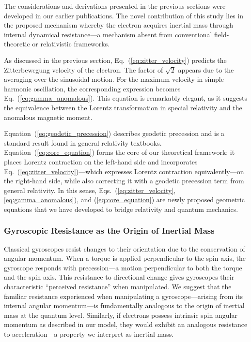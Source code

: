 \documentclass[%
 reprint,
 amsmath,amssymb,
 aps,
]{revtex4-1}
\numberwithin{equation}{section}%
\begin{document}
The considerations and derivations presented in the previous sections were developed in our earlier publications. The novel contribution of this study lies in the proposed mechanism whereby the electron acquires inertial mass through internal dynamical resistance—a mechanism absent from conventional field-theoretic or relativistic frameworks.

As discussed in the previous section, Eq.~(\ref{eq:zitter_velocity}) predicts the Zitterbewegung velocity of the electron. The factor of $\sqrt{2}$ appears due to the averaging over the sinusoidal motion. For the maximum velocity in simple harmonic oscillation, the corresponding expression becomes Eq.~(\ref{eq:gamma_anomalous}). This equation is remarkably elegant, as it suggests the equivalence between the Lorentz transformation in special relativity and the anomalous magnetic moment.

Equation~(\ref{eq:geodetic_precession}) describes geodetic precession and is a standard result found in general relativity textbooks. Equation~(\ref{eq:core_equation}) forms the core of our theoretical framework: it places Lorentz contraction on the left-hand side and incorporates Eq.~(\ref{eq:zitter_velocity})—which expresses Lorentz contraction equivalently—on the right-hand side, while also correcting it with a geodetic precession term from general relativity. In this sense, Eqs.~(\ref{eq:zitter_velocity}, \ref{eq:gamma_anomalous}), and (\ref{eq:core_equation}) are newly proposed geometric equations that we have developed to bridge relativity and quantum mechanics.


\subsubsection{Gyroscopic Resistance as the Origin of Inertial Mass}

Classical gyroscopes resist changes to their orientation due to the conservation of angular momentum. When a torque is applied perpendicular to the spin axis, the gyroscope responds with precession—a motion perpendicular to both the torque and the spin axis. This resistance to directional change gives gyroscopes their characteristic ``perceived resistance'' when manipulated. We suggest that the familiar resistance experienced when manipulating a gyroscope---arising from its internal angular momentum---is fundamentally analogous to the origin of inertial mass at the quantum level. Similarly, if electrons possess intrinsic spin angular momentum as described in our model, they would exhibit an analogous resistance to acceleration—a property we interpret as inertial mass.
\end{document}
